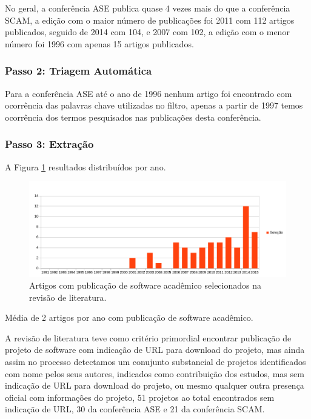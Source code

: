 No geral, a conferência ASE publica quase 4 vezes mais do que a conferência
SCAM, a edição com o maior número de publicações foi 2011 com 112 artigos
publicados, seguido de 2014 com 104, e 2007 com 102, a edição com o menor
número foi 1996 com apenas 15 artigos publicados.

\subsubsection{Passo 2: Triagem Automática}

Para a conferência ASE até o ano de 1996 nenhum artigo foi encontrado com
ocorrência das palavras chave utilizadas no filtro, apenas a partir de 1997
temos ocorrência dos termos pesquisados nas publicações desta conferência.

\subsubsection{Passo 3: Extração}

A Figura \ref{artigos-com-software-por-ano} resultados distribuídos por ano.

\begin{figure}[h]
  \center
  \includegraphics[scale=0.65]{imagens/artigos-com-software-por-ano.png}
  \caption{Artigos com publicação de software acadêmico selecionados na revisão de literatura.}
  \label{artigos-com-software-por-ano}
\end{figure}

Média de 2 artigos por ano com publicação de software acadêmico.

A revisão de literatura teve como critério primordial encontrar publicação
de projeto de software com indicação de URL para download do projeto, mas
ainda assim no processo detectamos um conujunto substancial de projetos
identificados com nome pelos seus autores, indicados como contribuição dos
estudos, mas sem indicação de URL para download do projeto, ou mesmo qualquer
outra presença oficial com informações do projeto, 51 projetos ao total
encontrados sem indicação de URL, 30 da conferência ASE e 21 da conferência SCAM.

